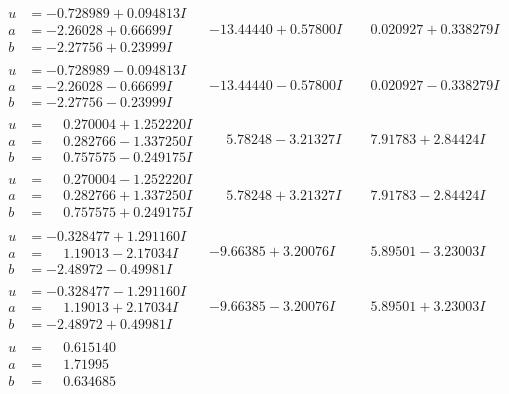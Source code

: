 \documentclass[1p]{elsarticle_modified}
\theoremstyle{definition}
\begin{document}
$$\begin{array}{c|c|c}
\begin{aligned}
u &= -0.728989 + 0.094813 I \\
a &= -2.26028 + 0.66699 I \\
b &= -2.27756 + 0.23999 I\end{aligned}
 & -13.44440 + 0.57800 I & \phantom{-}0.020927 + 0.338279 I \\ \hline\begin{aligned}
u &= -0.728989 - 0.094813 I \\
a &= -2.26028 - 0.66699 I \\
b &= -2.27756 - 0.23999 I\end{aligned}
 & -13.44440 - 0.57800 I & \phantom{-}0.020927 - 0.338279 I \\ \hline\begin{aligned}
u &= \phantom{-}0.270004 + 1.252220 I \\
a &= \phantom{-}0.282766 - 1.337250 I \\
b &= \phantom{-}0.757575 - 0.249175 I\end{aligned}
 & \phantom{-}5.78248 - 3.21327 I & \phantom{-}7.91783 + 2.84424 I \\ \hline\begin{aligned}
u &= \phantom{-}0.270004 - 1.252220 I \\
a &= \phantom{-}0.282766 + 1.337250 I \\
b &= \phantom{-}0.757575 + 0.249175 I\end{aligned}
 & \phantom{-}5.78248 + 3.21327 I & \phantom{-}7.91783 - 2.84424 I \\ \hline\begin{aligned}
u &= -0.328477 + 1.291160 I \\
a &= \phantom{-}1.19013 - 2.17034 I \\
b &= -2.48972 - 0.49981 I\end{aligned}
 & -9.66385 + 3.20076 I & \phantom{-}5.89501 - 3.23003 I \\ \hline\begin{aligned}
u &= -0.328477 - 1.291160 I \\
a &= \phantom{-}1.19013 + 2.17034 I \\
b &= -2.48972 + 0.49981 I\end{aligned}
 & -9.66385 - 3.20076 I & \phantom{-}5.89501 + 3.23003 I \\ \hline\begin{aligned}
u &= \phantom{-}0.615140\phantom{ +0.000000I} \\
a &= \phantom{-}1.71995\phantom{ +0.000000I} \\
b &= \phantom{-}0.634685\phantom{ +0.000000I}\end{aligned}

\end{array}$$
\end{document}
